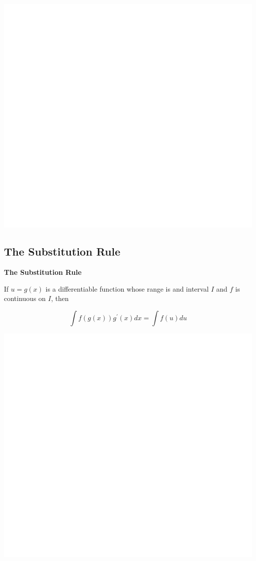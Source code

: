 \documentclass[]{book}
\begin{document}
\begin{center}\includegraphics[width=1\linewidth]{figure/LB41-1} \end{center}

\hypertarget{the-substitution-rule}{%
\subsection{The Substitution Rule}\label{the-substitution-rule}}

\textbf{The Substitution Rule}

If \(u= g(x)\) is a differentiable function whose range is and interval \(I\) and \(f\) is continuous on \(I\), then

\[\int f(g(x))g^\prime(x)dx=\int f(u)du\]

\begin{center}\includegraphics[width=1\linewidth]{figure/LB42-1} \end{center}
\end{document}

